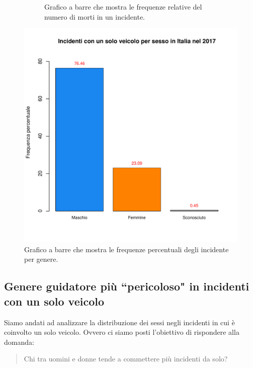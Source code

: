 \documentclass[12pt,a4paper,final,oneside]{article}			%
\begin{document}
\begin{figure}[h!]
\begin{subfigure}{0.48\textwidth}
                \caption{Grafico a barre che mostra le frequenze relative del numero di morti in un incidente.}
                \label{Fig: numero_feriti_per_incidente}
            \end{subfigure}
            \caption{}
        \end{figure}
        \begin{figure}[h!]
            \centering
            \includegraphics[scale=0.5]{../results/incidenti_per_sesso.pdf}
            \caption{Grafico a barre che mostra le frequenze percentuali degli incidente per genere.}
            \label{Fig: sesso_incidenti}
        \end{figure}
        
    \subsection{Genere guidatore più ``pericoloso" in incidenti con un solo veicolo}

        
        Siamo andati ad analizzare la distribuzione dei sessi negli incidenti in cui è coinvolto un solo veicolo. Ovvero ci siamo posti l'obiettivo di rispondere alla domanda: 
        \begin{quote}
        Chi tra uomini e donne tende a commettere più incidenti da solo?
        \end{quote}
        
\end{document}
